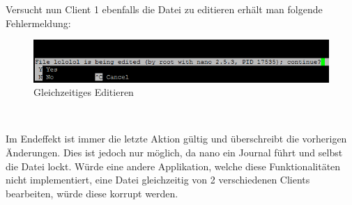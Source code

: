 Versucht nun Client 1 ebenfalls die Datei zu editieren erhält man folgende Fehlermeldung:
\begin{figure}[!h]
	\begin{center}
		\includegraphics[width=0.8\linewidth]{images/error.png}
		\caption{Gleichzeitiges Editieren}
		\label{error}
	\end{center}
\end{figure}\

Im Endeffekt ist immer die letzte Aktion gültig und überschreibt die vorherigen Änderungen.
Dies ist jedoch nur möglich, da nano ein Journal führt und selbst die Datei lockt. Würde eine andere Applikation, welche diese Funktionalitäten nicht implementiert, eine Datei gleichzeitig von 2 verschiedenen Clients bearbeiten, würde diese korrupt werden. 